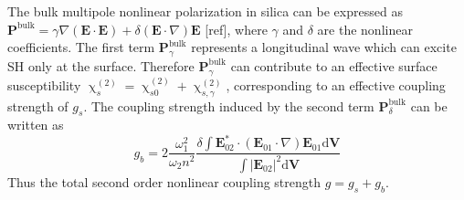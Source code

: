 \documentclass[a4paper,8pt,hyperref, twocolumn]{article}
\begin{document}
The bulk multipole nonlinear polarization in silica can be expressed as $\mathbf{P}^{\mathrm{bulk}} =  \gamma\nabla(\mathbf{E}\cdot\mathbf{E})+\delta(\mathbf{E}\cdot\nabla)\mathbf{E}$ [ref], where $\gamma$ and $\delta$ are the nonlinear coefficients. The first term $\mathbf{P}^{\mathrm{bulk}}_\gamma$ represents a longitudinal wave which can excite SH only at the surface. Therefore $\mathbf{P}^{\mathrm{bulk}}_\gamma$ can contribute to an effective surface susceptibility $\upchi^{(2)}_s = \upchi^{(2)}_{s0}+\upchi^{(2)}_{s,\gamma}$\cite{heinz1991second}, corresponding to an effective coupling strength of $g_s$. The coupling strength induced by the second term $\mathbf{P}^{\mathrm{bulk}}_\delta$ can be written as %
\begin{equation}
g_b =  2\frac{\omega_1^2}{\omega_2n^2}\frac{\delta \int \mathbf{E}_{02}^* \cdot (\mathbf{E}_{01}\cdot\nabla)\mathbf{E}_{01} \mathrm{d}	\mathbf{V}}{\int |\mathbf{E}_{02}|^2 \mathrm{d} \mathbf{V}}
\label{eq:gb}
\end{equation}
Thus the total second order nonlinear coupling strength $g = g_s+g_b$. 
\end{document}
